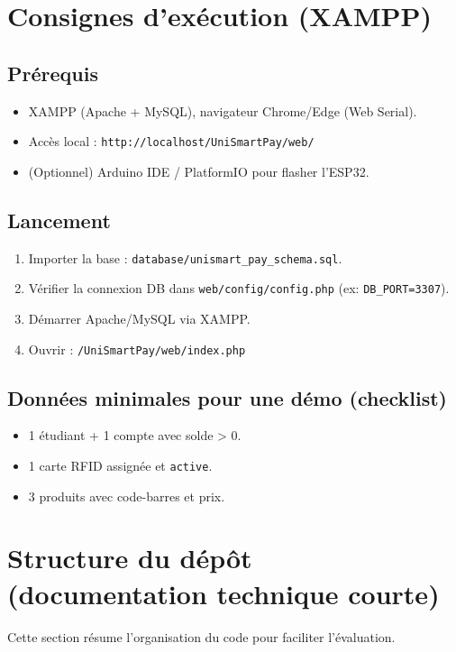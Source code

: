 \documentclass[12pt,a4paper]{report}
\begin{document}
\section{Consignes d’exécution (XAMPP)}
\subsection{Prérequis}
\begin{itemize}
  \item XAMPP (Apache + MySQL), navigateur Chrome/Edge (Web Serial).
  \item Accès local : \texttt{http://localhost/UniSmartPay/web/}
  \item (Optionnel) Arduino IDE / PlatformIO pour flasher l’ESP32.
\end{itemize}

\subsection{Lancement}
\begin{enumerate}
  \item Importer la base : \texttt{database/unismart_pay_schema.sql}.
  \item Vérifier la connexion DB dans \texttt{web/config/config.php} (ex: \texttt{DB\_PORT=3307}).
  \item Démarrer Apache/MySQL via XAMPP.
  \item Ouvrir : \texttt{/UniSmartPay/web/index.php}
\end{enumerate}

\subsection{Données minimales pour une démo (checklist)}
\begin{itemize}
  \item 1 étudiant + 1 compte avec solde > 0.
  \item 1 carte RFID assignée et \texttt{active}.
  \item 3 produits avec code-barres et prix.
\end{itemize}

\section{Structure du dépôt (documentation technique courte)}
Cette section résume l’organisation du code pour faciliter l’évaluation.
\end{document}
